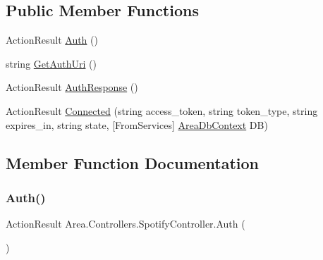 \subsection*{Public Member Functions}
\begin{DoxyCompactItemize}
\item 
Action\+Result \mbox{\hyperlink{classArea_1_1Controllers_1_1SpotifyController_ac6ab1164412f4ec9ad7a9ad58ff5dc4f}{Auth}} ()
\item 
string \mbox{\hyperlink{classArea_1_1Controllers_1_1SpotifyController_a7d88f1761fc5ea275a0ccce707e81289}{Get\+Auth\+Uri}} ()
\item 
Action\+Result \mbox{\hyperlink{classArea_1_1Controllers_1_1SpotifyController_a47e94b8071f1917dba3f62cd9e4e9601}{Auth\+Response}} ()
\item 
Action\+Result \mbox{\hyperlink{classArea_1_1Controllers_1_1SpotifyController_a168ce6acbbe7e20e27742781a39bce95}{Connected}} (string access\+\_\+token, string token\+\_\+type, string expires\+\_\+in, string state, \mbox{[}From\+Services\mbox{]} \mbox{\hyperlink{classArea_1_1DAT_1_1AreaDbContext}{Area\+Db\+Context}} DB)
\end{DoxyCompactItemize}


\subsection{Member Function Documentation}
\mbox{\label{classArea_1_1Controllers_1_1SpotifyController_ac6ab1164412f4ec9ad7a9ad58ff5dc4f}} 
\subsubsection{\texorpdfstring{Auth()}{Auth()}}
{\footnotesize\ttfamily Action\+Result Area.\+Controllers.\+Spotify\+Controller.\+Auth (\begin{DoxyParamCaption}{ }\end{DoxyParamCaption})\hspace{0.3cm}{\ttfamily [inline]}}

\mbox{\label{classArea_1_1Controllers_1_1SpotifyController_a47e94b8071f1917dba3f62cd9e4e9601}} 
